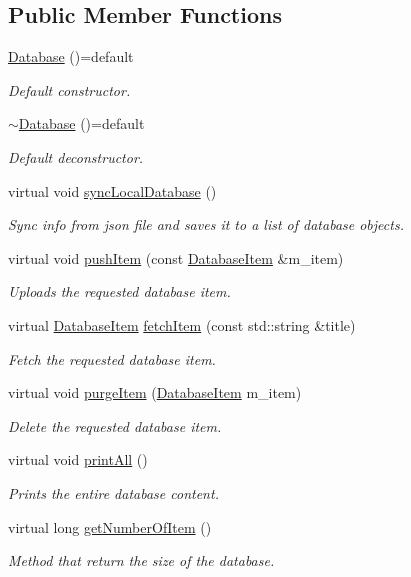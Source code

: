 \subsection*{Public Member Functions}
\begin{DoxyCompactItemize}
\item 
\hyperlink{classDatabase_aa57fbada3001c2db58a0ca6c7071bd18}{Database} ()=default
\begin{DoxyCompactList}\small\item\em Default constructor. \end{DoxyCompactList}\item 
\hyperlink{classDatabase_a341cd0fe8c615e829e3a22b74c208bb5}{$\sim$\+Database} ()=default
\begin{DoxyCompactList}\small\item\em Default deconstructor. \end{DoxyCompactList}\item 
virtual void \hyperlink{classDatabase_a14d24487b4ea3b50097b9ac0f2b3f317}{sync\+Local\+Database} ()
\begin{DoxyCompactList}\small\item\em Sync info from json file and saves it to a list of database objects. \end{DoxyCompactList}\item 
virtual void \hyperlink{classDatabase_a80fa14ab9f4deadc9a2ab7493f1919a4}{push\+Item} (const \hyperlink{classDatabaseItem}{Database\+Item} \&m\+\_\+item)
\begin{DoxyCompactList}\small\item\em Uploads the requested database item. \end{DoxyCompactList}\item 
virtual \hyperlink{classDatabaseItem}{Database\+Item} \hyperlink{classDatabase_a40254eec69c7d7cc15da24a9f0b072b3}{fetch\+Item} (const std\+::string \&title)
\begin{DoxyCompactList}\small\item\em Fetch the requested database item. \end{DoxyCompactList}\item 
virtual void \hyperlink{classDatabase_a8f47437526eeec631f1328fab9bbbc75}{purge\+Item} (\hyperlink{classDatabaseItem}{Database\+Item} m\+\_\+item)
\begin{DoxyCompactList}\small\item\em Delete the requested database item. \end{DoxyCompactList}\item 
virtual void \hyperlink{classDatabase_afa345da530fd5c8dfe0c978917cd6049}{print\+All} ()
\begin{DoxyCompactList}\small\item\em Prints the entire database content. \end{DoxyCompactList}\item 
virtual long \hyperlink{classDatabase_a230225cb341eb23a99a83ef3d1abae53}{get\+Number\+Of\+Item} ()
\begin{DoxyCompactList}\small\item\em Method that return the size of the database. \end{DoxyCompactList}\end{DoxyCompactItemize}
